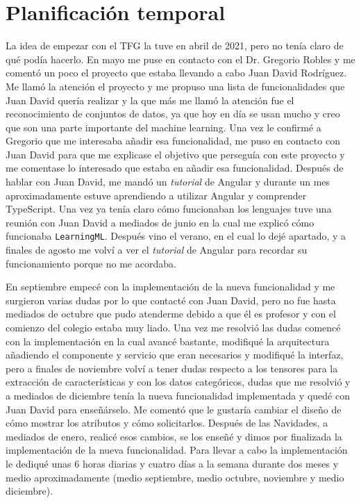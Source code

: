 \documentclass[a4paper, 12pt]{book}
\begin{document}
\section{Planificación temporal}

\label{sec:planificacion-temporal}

La idea de empezar con el TFG la tuve en abril de 2021, pero no tenía claro de qué podía hacerlo. En mayo me puse en contacto con el Dr. Gregorio Robles y me comentó un poco el proyecto que estaba llevando a cabo Juan David Rodríguez.
Me llamó la atención el proyecto y me propuso una lista de funcionalidades que Juan David quería realizar y la que más me llamó la atención fue el reconocimiento de conjuntos de datos, ya que hoy en día se usan mucho y creo que son una parte importante del machine learning. 
Una vez le confirmé a Gregorio que me interesaba añadir esa funcionalidad, me puso en contacto con Juan David para que me explicase el objetivo que perseguía con este proyecto y me comentase lo interesado que estaba en añadir esa funcionalidad.
Después de hablar con Juan David, me mandó un \emph{tutorial} de Angular y durante un mes aproximadamente estuve aprendiendo a utilizar Angular y comprender TypeScript. Una vez ya tenía claro cómo funcionaban los lenguajes tuve una reunión con Juan David a mediados de junio en la cual me explicó cómo funcionaba \texttt{LearningML}.
Después vino el verano, en el cual lo dejé apartado, y a finales de agosto me volví a ver el \emph{tutorial} de Angular para recordar su funcionamiento porque no me acordaba. 

En septiembre empecé con la implementación de la nueva funcionalidad y me surgieron varias dudas por lo que contacté con Juan David, pero no fue hasta mediados de octubre que pudo atenderme debido a que él es profesor y con el comienzo del colegio estaba muy liado.
Una vez me resolvió las dudas comencé con la implementación en la cual avancé bastante, modifiqué la arquitectura añadiendo el componente y servicio que eran necesarios y modifiqué la interfaz, pero a finales de noviembre volví a tener dudas respecto a los tensores para la extracción de características y con los datos categóricos, dudas que me resolvió y a mediados de diciembre tenía la nueva funcionalidad implementada y quedé con Juan David para enseñárselo. Me comentó que le gustaría cambiar el diseño de cómo mostrar los atributos y cómo solicitarlos. Después de las Navidades, a mediados de enero, realicé esos cambios, se los enseñé y dimos por finalizada la implementación de la nueva funcionalidad. Para llevar a cabo la implementación le dediqué unas 6 horas diarias y cuatro días a la semana durante dos meses y medio aproximadamente (medio septiembre, medio octubre, noviembre y medio diciembre).
\end{document}
